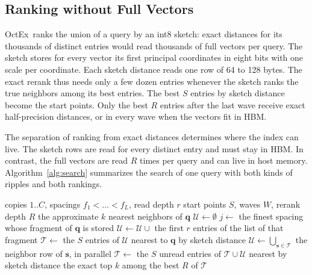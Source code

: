 \documentclass[letterpaper,twocolumn,10pt]{article}
\newcommand{\sysname}{OctEx}
\begin{document}
\subsection{Ranking without Full Vectors}
\label{sec:sketch}

\sysname\ ranks the union of a query by an int8 sketch: exact distances for its thousands of distinct entries would read thousands of full vectors per query. The sketch stores for every vector its first principal coordinates in eight bits with one scale per coordinate. Each sketch distance reads one row of 64 to 128 bytes. The exact rerank thus needs only a few dozen entries whenever the sketch ranks the true neighbors among its best entries. The best $S$ entries by sketch distance become the start points. Only the best $R$ entries after the last wave receive exact half-precision distances, or in every wave when the vectors fit in HBM.

The separation of ranking from exact distances determines where the index can live. The sketch rows are read for every distinct entry and must stay in HBM. In contrast, the full vectors are read $R$ times per query and can live in host memory. Algorithm~\ref{alg:search} summarizes the search of one query with both kinds of ripples and both rankings.

\begin{algorithm}[t]
\caption{Search of one query $\mathbf{q}$ in \sysname.}
\label{alg:search}
\begin{algorithmic}[1]
\Require copies $1..C$, spacings $f_1 < \dots < f_L$, read depth $r$
\Require start points $S$, waves $W$, rerank depth $R$
\Ensure the approximate $k$ nearest neighbors of $\mathbf{q}$
\State $\mathcal{U} \gets \emptyset$
  \State $j \gets$ the finest spacing whose fragment of $\mathbf{q}$ is stored
  \State $\mathcal{U} \gets \mathcal{U} \cup$ the first $r$ entries of the list of that fragment
\EndFor
\State $\mathcal{T} \gets$ the $S$ entries of $\mathcal{U}$ nearest to $\mathbf{q}$ by sketch distance
  \State $\mathcal{U} \gets \bigcup_{\mathbf{s} \in \mathcal{T}}$ the neighbor row of $\mathbf{s}$, in parallel
  \State $\mathcal{T} \gets$ the $S$ unread entries of $\mathcal{T} \cup \mathcal{U}$ nearest by sketch distance
\EndFor
\State \Return the exact top $k$ among the best $R$ of $\mathcal{T}$
\end{algorithmic}
\end{algorithm}
\end{document}
